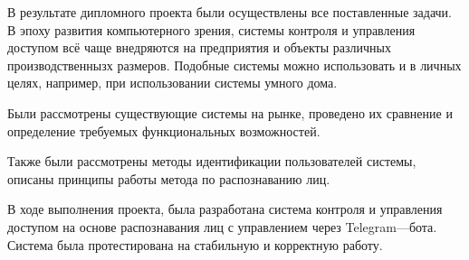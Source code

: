 
В результате дипломного проекта были осуществлены все поставленные задачи.
В эпоху развития компьютерного зрения, системы контроля и управления доступом
всё чаще внедряются на предприятия и объекты различных производственнызх
размеров. Подобные системы можно использовать и в личных целях, например, при
использовании системы умного дома.

Были рассмотрены существующие системы на рынке, проведено их сравнение
и определение требуемых функциональных возможностей.

Также были рассмотрены методы идентификации пользователей системы, описаны
принципы работы метода по распознаванию лиц.

В ходе выполнения проекта, была разработана система контроля и управления
доступом на основе распознавания лиц с управлением через Telegram—бота. Система
была протестирована на стабильную и корректную работу.
